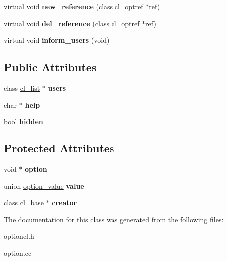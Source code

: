 \begin{DoxyCompactItemize}
\item 
\hypertarget{classcl__option_abda5402689da9bdfaf7a4292e79a3794}{
virtual void {\bfseries new\_\-reference} (class \hyperlink{classcl__optref}{cl\_\-optref} $\ast$ref)}
\label{classcl__option_abda5402689da9bdfaf7a4292e79a3794}

\item 
\hypertarget{classcl__option_a171748b865f73e9f84918795a1a5c109}{
virtual void {\bfseries del\_\-reference} (class \hyperlink{classcl__optref}{cl\_\-optref} $\ast$ref)}
\label{classcl__option_a171748b865f73e9f84918795a1a5c109}

\item 
\hypertarget{classcl__option_a745397439967699a9fc8814b39361a77}{
virtual void {\bfseries inform\_\-users} (void)}
\label{classcl__option_a745397439967699a9fc8814b39361a77}

\end{DoxyCompactItemize}
\subsection*{Public Attributes}
\begin{DoxyCompactItemize}
\item 
\hypertarget{classcl__option_a1483c8dd62e5992e7b4e5577f257bf5c}{
class \hyperlink{classcl__list}{cl\_\-list} $\ast$ {\bfseries users}}
\label{classcl__option_a1483c8dd62e5992e7b4e5577f257bf5c}

\item 
\hypertarget{classcl__option_a4af07a7cc992a83e6108b11acfc6e4ce}{
char $\ast$ {\bfseries help}}
\label{classcl__option_a4af07a7cc992a83e6108b11acfc6e4ce}

\item 
\hypertarget{classcl__option_ad71d5473e16cbebacab79220ea0349b7}{
bool {\bfseries hidden}}
\label{classcl__option_ad71d5473e16cbebacab79220ea0349b7}

\end{DoxyCompactItemize}
\subsection*{Protected Attributes}
\begin{DoxyCompactItemize}
\item 
\hypertarget{classcl__option_acbb8db0fe549d278c38290d357aaace5}{
void $\ast$ {\bfseries option}}
\label{classcl__option_acbb8db0fe549d278c38290d357aaace5}

\item 
\hypertarget{classcl__option_a0aed4ba999857ebb65589e214484f198}{
union \hyperlink{unionoption__value}{option\_\-value} {\bfseries value}}
\label{classcl__option_a0aed4ba999857ebb65589e214484f198}

\item 
\hypertarget{classcl__option_a3ae9fa397a3665941b1af35650d2a24a}{
class \hyperlink{classcl__base}{cl\_\-base} $\ast$ {\bfseries creator}}
\label{classcl__option_a3ae9fa397a3665941b1af35650d2a24a}

\end{DoxyCompactItemize}


The documentation for this class was generated from the following files:\begin{DoxyCompactItemize}
\item 
optioncl.h\item 
option.cc\end{DoxyCompactItemize}
